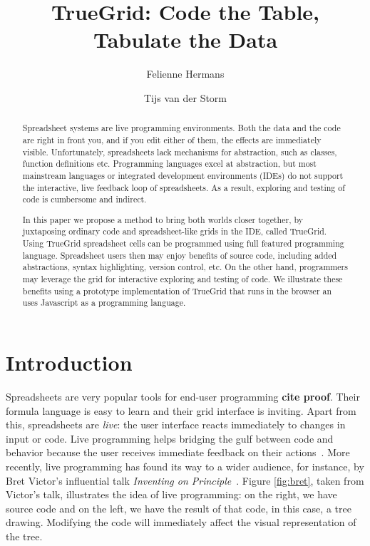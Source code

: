 \documentclass{llncs}
\newcommand{\todo}[1]{\textbf{#1}}
\begin{document}
\title{TrueGrid: Code the Table, Tabulate the Data}
\author{Felienne Hermans \and Tijs van der Storm}
\maketitle
\begin{abstract}
Spreadsheet systems are live programming environments. Both the data and the code are right in front you, and if you edit either of them, the effects are immediately visible. Unfortunately, spreadsheets lack mechanisms for abstraction, such as classes, function definitions etc. Programming languages excel at abstraction, but most mainstream languages or integrated development environments (IDEs) do not support the interactive, live feedback loop of spreadsheets. As a result, exploring and testing of code is cumbersome and indirect. 

In this paper we propose a method to bring both worlds closer together, by juxtaposing ordinary code and spreadsheet-like grids in the IDE, called TrueGrid. Using TrueGrid spreadsheet cells can be programmed using full featured programming language. Spreadsheet users then may enjoy benefits of source code, including added abstractions, syntax highlighting, version control, etc. On the other hand, programmers may leverage the grid for interactive exploring and testing of code. 
We illustrate these benefits using a prototype implementation of TrueGrid that runs in the browser an uses Javascript as a programming language.
\end{abstract}

\section{Introduction}
Spreadsheets are very popular tools for end-user programming \todo{cite proof}. Their formula language is easy to learn and their grid interface is inviting. Apart from this, spreadsheets are \textit{live}: the  user interface reacts immediately to changes in input or code.
Live programming helps bridging the gulf between code and behavior because the user receives immediate feedback on their actions~\cite{lieberman1995bridging}.
More recently, live programming has found its way to a wider audience, for instance, by Bret Victor's influential talk \textit{Inventing on Principle}~\cite{Victor2012}. Figure \ref{fig:bret}, taken from Victor's talk, illustrates the idea of live programming: on the right, we have source code and on the left, we have the result of that code, in this case, a tree drawing. Modifying the code will immediately affect the visual representation of the tree.
\end{document}
